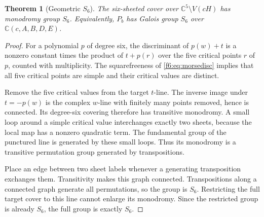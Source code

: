 \documentclass[11pt,a4paper]{article}
\newtheorem{theorem}{Theorem}[section]
\theoremstyle{definition}
\newcommand{\C}{\mathbb C}
\begin{document}
\begin{theorem}[Geometric $S_6$]\label{f6:thm:geometricS6}
The six-sheeted cover over $\C^5\setminus V(cH)$ has monodromy group
$S_6$. Equivalently, $P_b$ has Galois group $S_6$ over
$\C(c,A,B,D,E)$.
\end{theorem}
\begin{proof}
For a polynomial $p$ of degree six, the discriminant of $p(w)+t$ is a
nonzero constant times the product of $t+p(r)$ over the five critical
points $r$ of $p$, counted with multiplicity. The squarefreeness of
\eqref{f6:eq:morsedisc} implies that all five critical points are simple
and their critical values are distinct.

Remove the five critical values from the target $t$-line. The inverse
image under $t=-p(w)$ is the complex $w$-line with finitely many points
removed, hence is connected. Its degree-six covering therefore has
transitive monodromy. A small loop around a simple critical value
interchanges exactly two sheets, because the local map has a nonzero
quadratic term. The fundamental group of the punctured line is generated
by these small loops. Thus its monodromy is a transitive permutation
group generated by transpositions.

Place an edge between two sheet labels whenever a generating
transposition exchanges them. Transitivity makes this graph connected.
Transpositions along a connected graph generate all permutations, so
the group is $S_6$. Restricting the full target cover to this line cannot
enlarge its monodromy. Since the restricted group is already $S_6$, the
full group is exactly $S_6$.
\end{proof}

\end{document}
